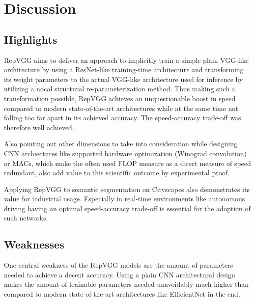 \section{Discussion} \label{discussion}

\subsection{Highlights}

RepVGG aims to deliver an approach to implicitly train a simple plain VGG-like architecture by using a ResNet-like training-time architecture and transforming its weight parameters to the actual VGG-like architecture used for inference by utilizing a nocal structural re-parameterization method. Thus making such a transformation possible, RepVGG achieves an unquestionable boost in speed compared to modern state-of-the-art architectures while at the same time not falling too far apart in its achieved accuracy. The speed-accuracy trade-off was therefore well achieved. 

Also pointing out other dimensions to take into consideration while designing CNN archiectures like supported hardware optimization (Winograd convolution) or MACs, which make the often used FLOP measure as a direct measure of speed redundant, also add value to this scientific outcome by experimental proof.

Applying RepVGG to semantic segmentation on Cityscapes also demonstrates its value for industrial usage. Especially in real-time environments like autonomous driving having an optimal speed-accuracy trade-off is essential for the adoption of such networks. 

\subsection{Weaknesses}

One central weakness of the RepVGG models are the amount of parameters needed to achieve a decent accuracy. Using a plain CNN architectural design makes the amount of trainable parameters needed unavoidably much higher than compared to modern state-of-the-art architectures like EfficientNet in the end.  

